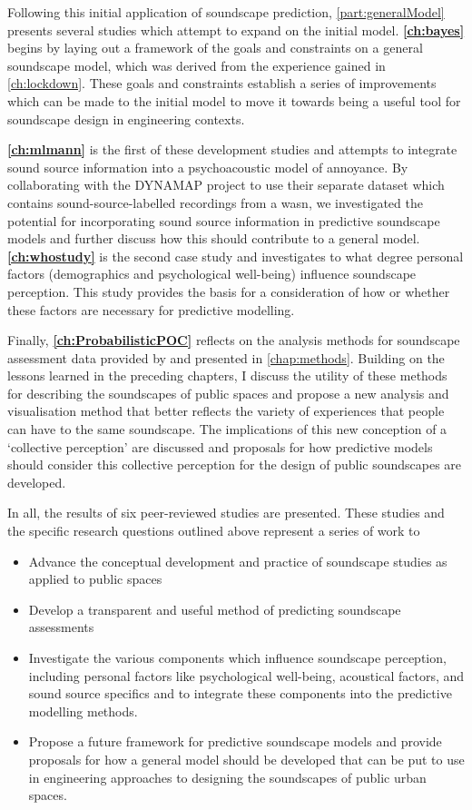 Following this initial application of soundscape prediction, \cref{part:generalModel} presents several studies which attempt to expand on the initial model. \textbf{\cref{ch:bayes}} begins by laying out a framework of the goals and constraints on a general soundscape model, which was derived from the experience gained in \cref{ch:lockdown}. These goals and constraints establish a series of improvements which can be made to the initial model to move it towards being a useful tool for soundscape design in engineering contexts. 

\textbf{\cref{ch:mlmann}} is the first of these development studies and attempts to integrate sound source information into a psychoacoustic model of annoyance. By collaborating with the DYNAMAP project to use their separate dataset which contains sound-source-labelled recordings from a \gls{wasn}, we investigated the potential for incorporating sound source information in predictive soundscape models and further discuss how this should contribute to a general model. \textbf{\cref{ch:whostudy}} is the second case study and investigates to what degree personal factors (demographics and psychological well-being) influence soundscape perception. This study provides the basis for a consideration of how or whether these factors are necessary for predictive modelling.

Finally, \textbf{\cref{ch:ProbabilisticPOC}} reflects on the analysis methods for soundscape assessment data provided by \citet{ISO12913Part2} and presented in \cref{chap:methods}. Building on the lessons learned in the preceding chapters, I discuss the utility of these methods for describing the soundscapes of public spaces and propose a new analysis and visualisation method that better reflects the variety of experiences that people can have to the same soundscape. The implications of this new conception of a `collective perception' are discussed and proposals for how predictive models should consider this collective perception for the design of public soundscapes are developed.

In all, the results of six peer-reviewed studies are presented. These studies and the specific research questions outlined above represent a series of work to

\begin{itemize}
  \item Advance the conceptual development and practice of soundscape studies as applied to public spaces
  \item Develop a transparent and useful method of predicting soundscape assessments
  \item Investigate the various components which influence soundscape perception, including personal factors like psychological well-being, acoustical factors, and sound source specifics and to integrate these components into the predictive modelling methods.
  \item Propose a future framework for predictive soundscape models and provide proposals for how a general model should be developed that can be put to use in engineering approaches to designing the soundscapes of public urban spaces. 
\end{itemize}

